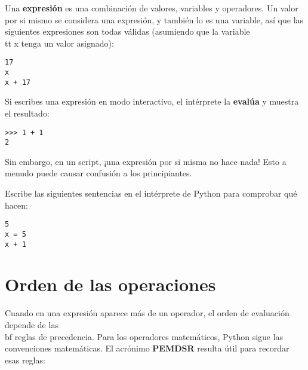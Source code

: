 Una {\bf expresión} es una combinación de valores, variables y operadores.
Un valor por si mismo se considera una expresión, y también lo es
una variable, así que las siguientes expresiones son todas válidas
(asumiendo que la variable {\\tt x} tenga un valor asignado):


\beforeverb
\begin{verbatim}
17
x
x + 17
\end{verbatim}
\afterverb
%
Si escribes una expresión en modo interactivo, el intérprete la
{\bf evalúa} y muestra el resultado:

\beforeverb
\begin{verbatim}
>>> 1 + 1
2
\end{verbatim}
\afterverb
%
Sin embargo, en un script, ¡una expresión por si misma no hace nada!
Esto a menudo puede causar confusión
a los principiantes.

\begin{ex}
Escribe las siguientes sentencias en el intérprete de Python para comprobar
qué hacen:

\beforeverb
\begin{verbatim}
5
x = 5
x + 1
\end{verbatim}
\afterverb
%
\end{ex}


\section{Orden de las operaciones}

Cuando en una expresión aparece más de un operador, el orden de
evaluación depende de las {\\bf reglas de precedencia}. Para los
operadores matemáticos, Python sigue las convenciones matemáticas.
El acrónimo {\bf PEMDSR} resulta útil para
recordar esas reglas:


